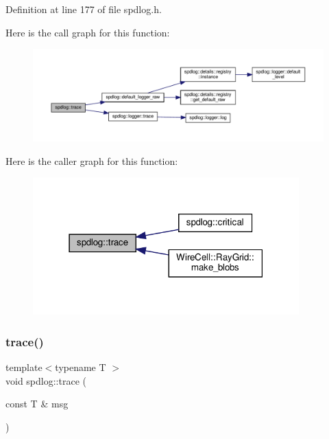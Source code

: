 Definition at line 177 of file spdlog.\+h.

Here is the call graph for this function\+:
\nopagebreak
\begin{figure}[H]
\begin{center}
\leavevmode
\includegraphics[width=350pt]{namespacespdlog_a0ec6777ea7982bcf7cf85b87b0619b56_cgraph}
\end{center}
\end{figure}
Here is the caller graph for this function\+:
\nopagebreak
\begin{figure}[H]
\begin{center}
\leavevmode
\includegraphics[width=291pt]{namespacespdlog_a0ec6777ea7982bcf7cf85b87b0619b56_icgraph}
\end{center}
\end{figure}
\mbox{\label{namespacespdlog_a99302a3f872e2cba98f81ac1a2f63321}} 
\subsubsection{\texorpdfstring{trace()}{trace()}\hspace{0.1cm}{\footnotesize\ttfamily [2/2]}}
{\footnotesize\ttfamily template$<$typename T $>$ \\
void spdlog\+::trace (\begin{DoxyParamCaption}\item[{const T \&}]{msg }\end{DoxyParamCaption})\hspace{0.3cm}{\ttfamily [inline]}}



